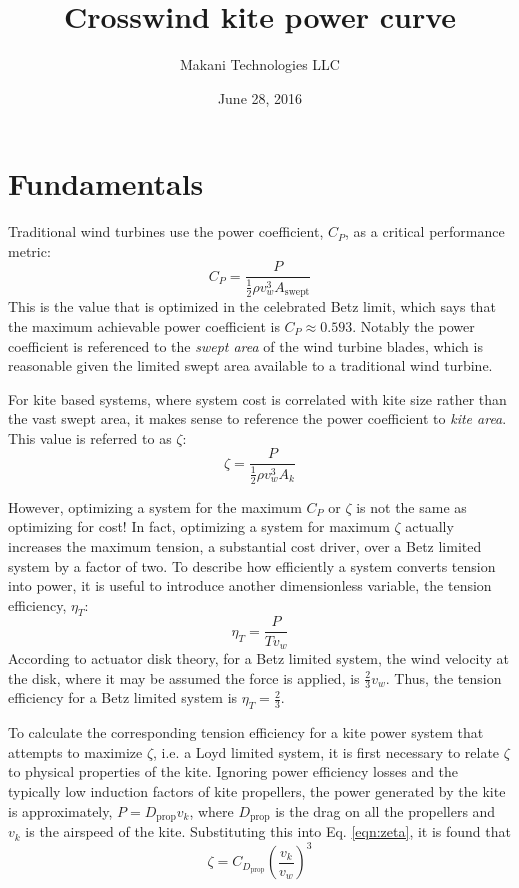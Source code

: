 \documentclass[11pt]{amsart}
\title{Crosswind kite power curve}
\author{Makani Technologies LLC}
\date{June 28, 2016}
\newcommand{\kite}{k}
\newcommand{\prop}{\mathrm{prop}}
\newcommand{\swept}{\mathrm{swept}}
\newcommand{\wind}{w}
\begin{document}
\maketitle

\section{Fundamentals}
\label{sec:fundamentals}

Traditional wind turbines use the power coefficient, $C_P$, as a
critical performance metric:
%
\begin{equation}
C_P = \frac{P}{\frac{1}{2} \rho v_{\wind}^3 A_{\swept}}
\end{equation}
%
This is the value that is optimized in the celebrated Betz limit,
which says that the maximum achievable power coefficient is $C_P \approx 0.593$.
Notably the power coefficient is referenced to the {\it swept area} of
the wind turbine blades, which is reasonable given the limited swept
area available to a traditional wind turbine.

For kite based systems, where system cost is correlated with kite size
rather than the vast swept area, it makes sense to reference the power
coefficient to {\it kite area}.  This value is referred to as $\zeta$:
%
\begin{equation}
\label{eqn:zeta}
\zeta = \frac{P}{\frac{1}{2} \rho v_{\wind}^3 A_{\kite}}
\end{equation}

However, optimizing a system for the maximum $C_P$ or $\zeta$ is not
the same as optimizing for cost!  In fact, optimizing a system for
maximum $\zeta$ actually increases the maximum tension, a substantial
cost driver, over a Betz limited system by a factor of two.  To
describe how efficiently a system converts tension into power, it is
useful to introduce another dimensionless variable, the tension
efficiency, $\eta_T$:
%
\begin{equation}
\label{eqn:eta_T}
\eta_T = \frac{P}{T v_{\wind}}
\end{equation}
%
According to actuator disk theory, for a Betz limited system, the wind
velocity at the disk, where it may be assumed the force is applied, is
$\frac{2}{3} v_{\wind}$.  Thus, the tension efficiency for a Betz
limited system is $\eta_T = \frac{2}{3}$.

To calculate the corresponding tension efficiency for a kite power
system that attempts to maximize $\zeta$, i.e. a Loyd limited system,
it is first necessary to relate $\zeta$ to physical properties of the
kite.  Ignoring power efficiency losses and the typically low
induction factors of kite propellers, the power generated by the kite
is approximately, $P = D_{\prop} v_{\kite}$, where $D_{\prop}$ is the
drag on all the propellers and $v_{\kite}$ is the airspeed of the
kite.  Substituting this into Eq. \ref{eqn:zeta}, it is found that
%
\begin{equation}
\label{eqn:zeta_prop}
\zeta = C_{D_{\prop}} \left(\frac{v_{\kite}}{v_{\wind}} \right)^3
\end{equation}
\end{document}
